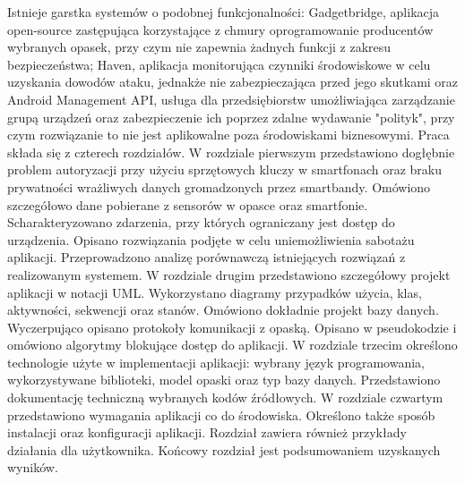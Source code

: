 \indent Istnieje garstka systemów o podobnej funkcjonalności: Gadgetbridge, aplikacja open-source zastępująca korzystające z chmury oprogramowanie producentów wybranych opasek, przy czym nie zapewnia 
żadnych funkcji z zakresu bezpieczeństwa; Haven, aplikacja monitorująca czynniki środowiskowe w celu 
uzyskania dowodów ataku, jednakże nie zabezpieczająca przed jego skutkami oraz Android Management API, usługa dla przedsiębiorstw umożliwiająca zarządzanie grupą urządzeń oraz zabezpieczenie ich poprzez zdalne wydawanie "polityk", 
przy czym rozwiązanie to nie jest aplikowalne poza środowiskami biznesowymi.
\newline\newline
\indent Praca składa się z czterech rozdziałów. W rozdziale pierwszym przedstawiono dogłębnie problem autoryzacji przy użyciu sprzętowych kluczy w smartfonach oraz braku prywatności wrażliwych danych gromadzonych przez smartbandy. 
Omówiono szczegółowo dane pobierane z sensorów w opasce oraz smartfonie. Scharakteryzowano zdarzenia, przy których ograniczany jest dostęp do 
urządzenia. Opisano rozwiązania podjęte w celu uniemożliwienia sabotażu aplikacji. Przeprowadzono analizę porównawczą istniejących rozwiązań z realizowanym 
systemem.
\newline\newline
\indent W rozdziale drugim przedstawiono szczegółowy projekt aplikacji w notacji UML. Wykorzystano diagramy przypadków użycia, klas, aktywności, sekwencji oraz stanów. 
Omówiono dokładnie projekt bazy danych. Wyczerpująco opisano protokoły komunikacji z opaską. Opisano w pseudokodzie i omówiono algorytmy blokujące dostęp do aplikacji. 
\newline\newline
\indent W rozdziale trzecim określono technologie użyte w implementacji aplikacji: wybrany język 
programowania, wykorzystywane biblioteki, model opaski oraz typ bazy danych. Przedstawiono dokumentację 
techniczną wybranych kodów źródłowych. 
\newline\newline
\indent W rozdziale czwartym przedstawiono wymagania aplikacji co do środowiska. Określono także sposób instalacji oraz konfiguracji aplikacji. Rozdział zawiera również przykłady działania dla 
użytkownika.
\newline\newline
\indent Końcowy rozdział jest podsumowaniem uzyskanych wyników.



